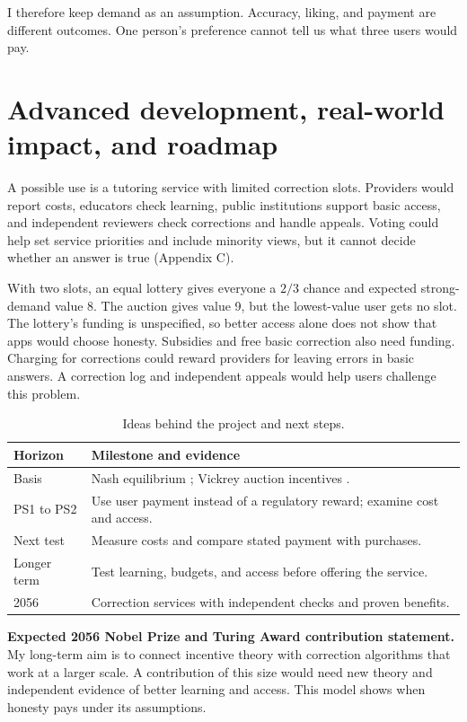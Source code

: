 I therefore keep demand as an assumption. Accuracy, liking, and payment are different outcomes. One person's preference cannot tell us what three users would pay.

\section{Advanced development, real-world impact, and roadmap}
A possible use is a tutoring service with limited correction slots. Providers would report costs, educators check learning, public institutions support basic access, and independent reviewers check corrections and handle appeals. Voting could help set service priorities and include minority views, but it cannot decide whether an answer is true (Appendix C).

With two slots, an equal lottery gives everyone a $2/3$ chance and expected strong-demand value 8. The auction gives value 9, but the lowest-value user gets no slot. The lottery's funding is unspecified, so better access alone does not show that apps would choose honesty. Subsidies and free basic correction also need funding. Charging for corrections could reward providers for leaving errors in basic answers. A correction log and independent appeals would help users challenge this problem.

\begin{table}[H]\centering
\caption{Ideas behind the project and next steps.}
\begin{tabularx}{\columnwidth}{@{}p{1.6cm}Y@{}}
\toprule \textbf{Horizon} & \textbf{Milestone and evidence}\\\midrule
Basis & Nash equilibrium \cite{nash1950}; Vickrey auction incentives \cite{vickrey1961}.\\
PS1 to PS2 & Use user payment instead of a regulatory reward; examine cost and access.\\
Next test & Measure costs and compare stated payment with purchases.\\
Longer term & Test learning, budgets, and access before offering the service.\\
2056 & Correction services with independent checks and proven benefits.\\
\bottomrule\end{tabularx}\end{table}

\noindent\textbf{Expected 2056 Nobel Prize and Turing Award contribution statement.}
My long-term aim is to connect incentive theory with correction algorithms that work at a larger scale. A contribution of this size would need new theory and independent evidence of better learning and access. This model shows when honesty pays under its assumptions.

